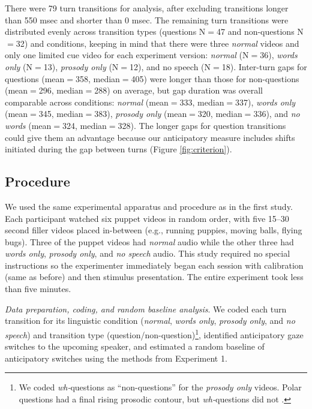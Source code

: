 \documentclass[authoryear, 12pt]{elsarticle}
\begin{document}
There were 79 turn transitions for analysis, after excluding transitions longer than 550 msec and shorter than 0 msec. The remaining turn transitions were distributed evenly across transition types (questions N$=$47 and non-questions N$=$32) and conditions, keeping in mind that there were three \textit{normal} videos and only one limited cue video for each experiment version: \textit{normal} (N$=$36), \textit{words only} (N$=$13), \textit{prosody only} (N$=$12), and {no speech} (N$=$18). Inter-turn gaps for questions (mean$=$358, median$=$405) were longer than those for non-questions (mean$=$296, median$=$288) on average, but gap duration was overall comparable across conditions: \textit{normal} (mean$=$333, median$=$337), \textit{words only} (mean$=$345, median$=$383), \textit{prosody only} (mean$=$320, median$=$336), and \textit{no words} (mean$=$324, median$=$328). The longer gaps for question transitions could give them an advantage because our anticipatory measure includes shifts initiated during the gap between turns (Figure \ref{fig:criterion}).

\subsection{Procedure}
We used the same experimental apparatus and procedure as in the first study. Each participant watched six puppet videos in random order, with five 15--30 second filler videos placed in-between (e.g., running puppies, moving balls, flying bugs). Three of the puppet videos had \textit{normal} audio while the other three had \textit{words only}, \textit{prosody only}, and \textit{no speech} audio. This study required no special instructions so the experimenter immediately began each session with calibration (same as before) and then stimulus presentation. The entire experiment took less than five minutes.

\textit{Data preparation, coding, and random baseline analysis}. We coded each turn transition for its linguistic condition (\textit{normal}, \textit{words only}, \textit{prosody only}, and \textit{no speech}) and transition type (question/non-question)\footnote{We coded \textit{wh-}questions as ``non-questions'' for the \textit{prosody only} videos. Polar questions had a final rising prosodic contour, but \textit{wh-}questions did not  \citep{hedberg2010}.}, identified anticipatory gaze switches to the upcoming speaker, and estimated a random baseline of anticipatory switches using the methods from Experiment 1.
\end{document}

